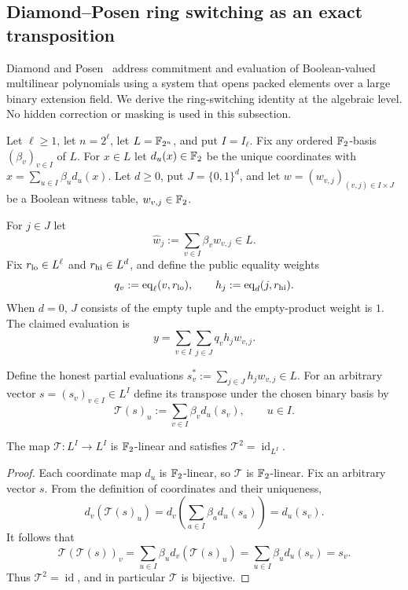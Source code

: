 \subsection{Diamond--Posen ring switching as an exact transposition}\label{sec:history:ring}

Diamond and Posen~\cite{DiamondPosen2024} address commitment and evaluation of Boolean-valued multilinear polynomials using a system that opens packed elements over a large binary extension field. We derive the ring-switching identity at the algebraic level. No hidden correction or masking is used in this subsection.

\begin{definition}\label{def:history:packing}
Let $\ell\geq1$, let $n=2^\ell$, let $L=\mathbb{F}_{2^n}$, and put $I=I_\ell$. Fix any ordered $\mathbb{F}_2$-basis $(\beta_v)_{v\in I}$ of $L$. For $x\in L$ let $d_u(x)\in\mathbb{F}_2$ be the unique coordinates with $x=\sum_{u\in I}\beta_u d_u(x)$. Let $d\geq0$, put $J=\{0,1\}^d$, and let $w=(w_{v,j})_{(v,j)\in I\times J}$ be a Boolean witness table, $w_{v,j}\in\mathbb{F}_2$.
\end{definition}

\begin{definition}\label{def:history:packedclaim}
For $j\in J$ let
\[
 \widehat w_j:=\sum_{v\in I}\beta_v w_{v,j}\in L.
\]
Fix $r_{\rm lo}\in L^\ell$ and $r_{\rm hi}\in L^d$, and define the public equality weights
\[
 q_v:=\operatorname{eq}_\ell(v,r_{\rm lo}),\qquad
 h_j:=\operatorname{eq}_d(j,r_{\rm hi}).
\]
When $d=0$, $J$ consists of the empty tuple and the empty-product weight is $1$.
The claimed evaluation is
\[
 y=\sum_{v\in I}\sum_{j\in J}q_vh_jw_{v,j}.
\]
\end{definition}

\begin{definition}\label{def:history:transpose}
Define the honest partial evaluations $s_v^{*}:=\sum_{j\in J}h_jw_{v,j}\in L$. For an arbitrary vector $s=(s_v)_{v\in I}\in L^I$ define its transpose under the chosen binary basis by
\begin{equation}\label{eq:history:transposition}
 \mathcal T(s)_u:=\sum_{v\in I}\beta_v d_u(s_v),\qquad u\in I.
\end{equation}
\end{definition}

\begin{lemma}\label{lem:history:involution}
The map $\mathcal T:L^I\to L^I$ is $\mathbb{F}_2$-linear and satisfies $\mathcal T^2=\operatorname{id}_{L^I}$.
\end{lemma}
\begin{proof}
Each coordinate map $d_u$ is $\mathbb{F}_2$-linear, so $\mathcal T$ is $\mathbb{F}_2$-linear. Fix an arbitrary vector $s$. From the definition of coordinates and their uniqueness,
\[
 d_v(\mathcal T(s)_u)
 =d_v\left(\sum_{a\in I}\beta_a d_u(s_a)\right)=d_u(s_v).
\]
It follows that
\[
 \mathcal T(\mathcal T(s))_v
 =\sum_{u\in I}\beta_u d_v(\mathcal T(s)_u)
 =\sum_{u\in I}\beta_u d_u(s_v)=s_v.
\]
Thus $\mathcal T^2=\operatorname{id}$, and in particular $\mathcal T$ is bijective.
\end{proof}


